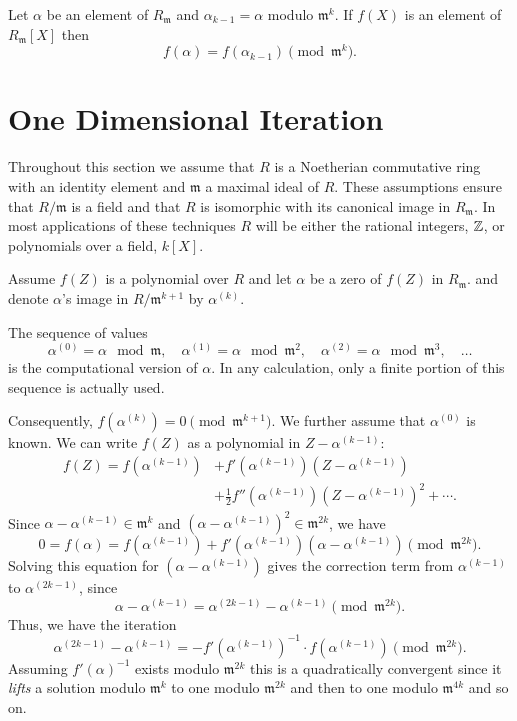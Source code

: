 \begin{proposition}
Let $\alpha$ be an element of $R_\mathfrak{m}$ and $\alpha_{k-1} = \alpha$
modulo $\mathfrak{m}^k$.  If $f(X)$ is an element of $R_\mathfrak{m}[X]$ then
\[
f(\alpha) = f(\alpha_{k-1}) \pmod{\mathfrak{m}^k}.
\]
\end{proposition}

\section{One Dimensional Iteration}
\label{Univariate:Newton:Sec}

Throughout this section we assume that $R$ is a Noetherian commutative
ring with an identity element and $\mathfrak{m}$ a
maximal ideal of $R$.  These assumptions ensure that $R/\mathfrak{m}$ is
a field and that $R$ is isomorphic with its canonical image in
$R_\mathfrak{m}$.  In most applications of these techniques $R$ will be
either the rational integers, $\mathbb{Z}$, or polynomials over a field,
$k[X]$.

Assume $f(Z)$ is a polynomial over $R$ and let $\alpha$ be a zero of $f(Z)$
in $R_\mathfrak{m}$. and denote $\alpha$'s image in $R/\mathfrak{m}^{k+1}$ by
$\alpha^{(k)}$.  

The sequence of values
\[
\alpha^{(0)} = \alpha \mod{\mathfrak{m}},\quad 
\alpha^{(1)} = \alpha \mod{\mathfrak{m}^2}, \quad
\alpha^{(2)} = \alpha \mod{\mathfrak{m}^3}, \quad \ldots
\]
is the computational version of $\alpha$. In any calculation, only a
finite portion of this sequence is actually used. 

Consequently, $f(\alpha^{(k)}) = 0 \pmod{\mathfrak{m}^{k+1}}$.  We
further assume that $\alpha^{(0)}$ is known.  We can write $f(Z)$ as a
polynomial in $Z - \alpha^{(k-1)}$:
\[
\begin{aligned}
f(Z) = f(\alpha^{(k-1)}) &+ f'(\alpha^{(k-1)}) (Z - \alpha^{(k-1)}) \\
 & + \frac{1}{2} f''(\alpha^{(k-1)}) (Z - \alpha^{(k-1)})^2 + \cdots.
\end{aligned}
\]
Since $\alpha-\alpha^{(k-1)} \in \mathfrak{m}^k$ and $(\alpha - \alpha^{(k-1)})^2
\in \mathfrak{m}^{2k}$, we have
\[
0 = f(\alpha) = f(\alpha^{(k-1)}) + f'(\alpha^{(k-1)}) (\alpha -
\alpha^{(k-1)}) \pmod{\mathfrak{m}^{2k}}.
\]
Solving this equation for $(\alpha - \alpha^{(k-1)})$ gives the correction
term from $\alpha^{(k-1)}$ to $\alpha^{(2k-1)}$, since
\[
\alpha - \alpha^{(k-1)} = \alpha^{(2k-1)} - \alpha^{(k-1)}
\pmod{\mathfrak{m}^{2k}}.
\]
Thus, we have the iteration
\begin{equation}\label{Basic:UNewton:Eq}
\alpha^{(2k-1)} - \alpha^{(k-1)} = - f'(\alpha^{(k-1)})^{-1} 
  \cdot f(\alpha^{(k-1)}) 
 \pmod{\mathfrak{m}^{2k}}.
\end{equation}
Assuming $f'(\alpha)^{-1}$ exists modulo $\mathfrak{m}^{2k}$ this is a
quadratically convergent
since it {\em lifts} a solution modulo $\mathfrak{m}^k$ to one modulo
$\mathfrak{m}^{2k}$ and then to one modulo $\mathfrak{m}^{4k}$ and so on.

